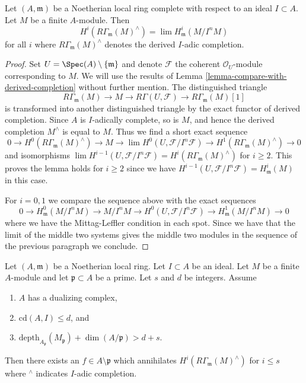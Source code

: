 \begin{lemma}
\label{lemma-local-cohomology-derived-completion}
Let $(A, \mathfrak m)$ be a Noetherian local ring complete with
respect to an ideal $I \subset A$. Let $M$ be a finite $A$-module.
Then
$$
H^i(R\Gamma_\mathfrak m(M)^\wedge) = \lim H^i_\mathfrak m(M/I^nM)
$$
for all $i$ where $R\Gamma_\mathfrak m(M)^\wedge$ denotes
the derived $I$-adic completion.
\end{lemma}

\begin{proof}
Set $U = \Spec(A) \setminus \{\mathfrak m\}$ and denote
$\mathcal{F}$ the coherent $\mathcal{O}_U$-module corresponding to $M$.
We will use the results of Lemma \ref{lemma-compare-with-derived-completion}
without further mention. The distinguished triangle
$$
R\Gamma_\mathfrak m(M) \to M \to R\Gamma(U, \mathcal{F}) \to
R\Gamma_\mathfrak m(M)[1]
$$
is transformed into another distinguished triangle by
the exact functor of derived completion.
Since $A$ is $I$-adically complete, so is $M$, and hence
the derived completion $M^\wedge$ is equal to $M$.
Thus we find a short exact sequence
$$
0 \to H^0(R\Gamma_\mathfrak m(M)^\wedge) \to M \to
\lim H^0(U, \mathcal{F}/I^n\mathcal{F}) \to
H^1(R\Gamma_\mathfrak m(M)^\wedge) \to 0
$$
and isomorphisms
$\lim H^{i - 1}(U, \mathcal{F}/I^n\mathcal{F}) =
H^i(R\Gamma_\mathfrak m(M)^\wedge)$ for $i \geq 2$.
This proves the lemma holds for $i \geq 2$ since
we have $H^{i - 1}(U, \mathcal{F}/I^n\mathcal{F}) =
H^i_\mathfrak m(M)$ in this case.

\medskip\noindent
For $i = 0, 1$ we compare the sequence above with the exact sequences
$$
0 \to H^0_\mathfrak m(M/I^nM) \to M/I^nM \to
H^0(U, \mathcal{F}/I^n\mathcal{F}) \to
H^1_\mathfrak m(M/I^nM) \to 0
$$
where we have the Mittag-Leffler condition in each spot.
Since we have that the limit of the middle two systems
gives the middle two modules in the sequence of the previous
paragraph we conclude.
\end{proof}

\begin{lemma}
\label{lemma-kill-completion}
Let $(A, \mathfrak m)$ be a Noetherian local ring.
Let $I \subset A$ be an ideal. Let $M$ be a finite $A$-module and
let $\mathfrak p \subset A$ be a prime. Let $s$ and $d$ be integers. Assume
\begin{enumerate}
\item $A$ has a dualizing complex,
\item $\text{cd}(A, I) \leq d$, and
\item
$\text{depth}_{A_\mathfrak p}(M_\mathfrak p) + \dim(A/\mathfrak p) > d + s$.
\end{enumerate}
Then there exists an $f \in A \setminus \mathfrak p$ which annihilates
$H^i(R\Gamma_\mathfrak m(M)^\wedge)$ for $i \leq s$ where ${}^\wedge$
indicates $I$-adic completion.
\end{lemma}

